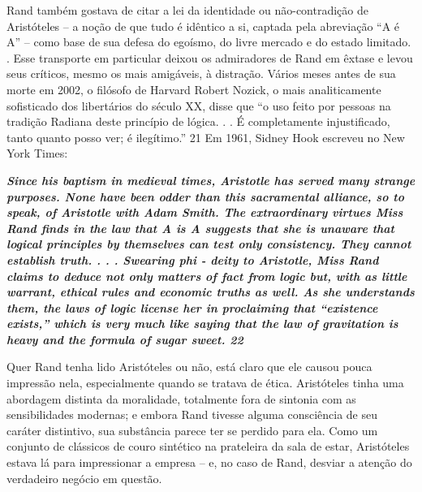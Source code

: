  
\par
 
Rand também gostava de citar a lei da identidade ou não-contradição de Aristóteles – a noção de que tudo é idêntico a si, captada pela abreviação “A é A” – como base de sua defesa do egoísmo, do livre mercado e do estado limitado. . Esse transporte em particular deixou os admiradores de Rand em êxtase e levou seus críticos, mesmo os mais amigáveis, à distração. Vários meses antes de sua morte em 2002, o filósofo de Harvard Robert Nozick, o mais analiticamente sofisticado dos libertários do século XX, disse que “o uso feito por pessoas na tradição Radiana deste princípio de lógica. . . É completamente injustificado, tanto quanto posso ver; é ilegítimo.”
 {\color{blue} 21}  
Em 1961, Sidney Hook escreveu no New York Times:
 
\par
 

 \textbf{\textit{Since his baptism in medieval times, Aristotle has served many strange purposes. None have been odder than this sacramental alliance, so to speak, of Aristotle with Adam Smith. The extraordinary virtues Miss Rand finds in the law that A is A suggests that she is unaware that logical principles by themselves can test only consistency. They cannot establish truth. . . . Swearing phi - deity to Aristotle, Miss Rand claims to deduce not only matters of fact from logic but, with as little warrant, ethical rules and economic truths as well. As she understands them, the laws of logic license her in proclaiming that “existence exists,” which is very much like saying that the law of gravitation is heavy and the formula of sugar sweet. {{\color{blue} 22} } } }  
 
 
\par
 
Quer Rand tenha lido Aristóteles ou não, está claro que ele causou pouca impressão nela, especialmente quando se tratava de ética. Aristóteles tinha uma abordagem distinta da moralidade, totalmente fora de sintonia com as sensibilidades modernas; e embora Rand tivesse alguma consciência de seu caráter distintivo, sua substância parece ter se perdido para ela. Como um conjunto de clássicos de couro sintético na prateleira da sala de estar, Aristóteles estava lá para impressionar a empresa – e, no caso de Rand, desviar a atenção do verdadeiro negócio em questão.
 
\par
 
